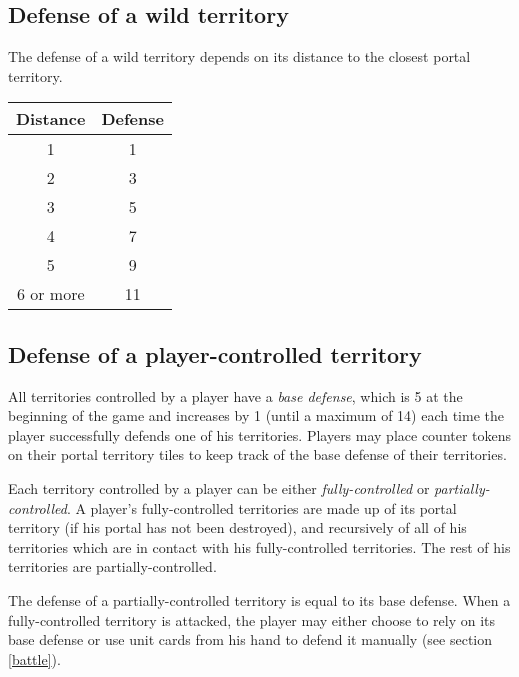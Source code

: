 \documentclass[a4paper]{article}
\begin{document}
    \subsection{Defense of a wild territory}
        The defense of a wild territory depends on its distance
        to the closest portal territory.
        \begin{table}[h]
        \centering
        \begin{tabular}{|c|c|}
             \hline
                  Distance & Defense \\
              \hline
                  1 & 1 \\
                  2 & 3 \\
                  3 & 5 \\
                  4 & 7 \\
                  5 & 9 \\
                  6 or more & 11 \\
              \hline
        \end{tabular}
        \end{table}
        
        
    \subsection{Defense of a player-controlled territory}
        \label{base-defense}
        All territories controlled by a player have a \textit{base defense},
        which is 5 at the beginning of the game and increases by 1
        (until a maximum of 14)
        each time the player successfully defends one of his territories.
        Players may place counter tokens on their portal territory tiles to keep
        track of the base defense of their territories.
        
        Each territory controlled by a player can be either \textit{fully-controlled}
        or \textit{partially-controlled}.
        A player's fully-controlled territories are made up of its portal territory
        (if his portal has not been destroyed), and recursively of all of his territories
        which are in contact with his fully-controlled territories.
        The rest of his territories are partially-controlled.
        
        The defense of a partially-controlled territory is equal to its base defense.
        When a fully-controlled territory is attacked,
        the player may either choose to rely on its base defense
        or use unit cards from his hand to defend it manually (see section \ref{battle}).
        
\end{document}
